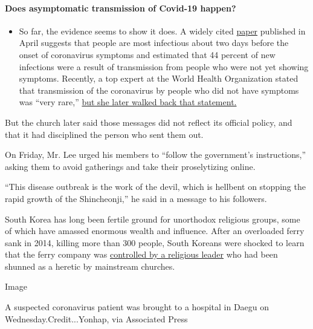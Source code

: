 \begin{itemize}
{  \paragraph{Does asymptomatic transmission of Covid-19
  happen?}\label{does-asymptomatic-transmission-of-covid-19-happen}}

  \begin{itemize}
  \tightlist
  \item
    So far, the evidence seems to show it does. A widely cited
    \href{https://www.nature.com/articles/s41591-020-0869-5}{paper}
    published in April suggests that people are most infectious about
    two days before the onset of coronavirus symptoms and estimated that
    44 percent of new infections were a result of transmission from
    people who were not yet showing symptoms. Recently, a top expert at
    the World Health Organization stated that transmission of the
    coronavirus by people who did not have symptoms was ``very rare,''
    \href{https://www.nytimes.com/2020/06/09/world/coronavirus-updates.html?action=click\&pgtype=Article\&state=default\&region=MAIN_CONTENT_3\&context=storylines_faq\#link-1f302e21}{but
    she later walked back that statement.}
  \end{itemize}
\end{itemize}

But the church later said those messages did not reflect its official
policy, and that it had disciplined the person who sent them out.

On Friday, Mr. Lee urged his members to ``follow the government's
instructions,'' asking them to avoid gatherings and take their
proselytizing online.

``This disease outbreak is the work of the devil, which is hellbent on
stopping the rapid growth of the Shincheonji,'' he said in a message to
his followers.

South Korea has long been fertile ground for unorthodox religious
groups, some of which have amassed enormous wealth and influence. After
an overloaded ferry sank in 2014, killing more than 300 people, South
Koreans were shocked to learn that the ferry company was
\href{https://www.nytimes.com/2014/07/27/world/asia/in-ferry-deaths-a-south-korean-tycoons-downfall.html}{controlled
by a religious leader} who had been shunned as a heretic by mainstream
churches.

Image

A suspected coronavirus patient was brought to a hospital in Daegu on
Wednesday.Credit...Yonhap, via Associated Press

